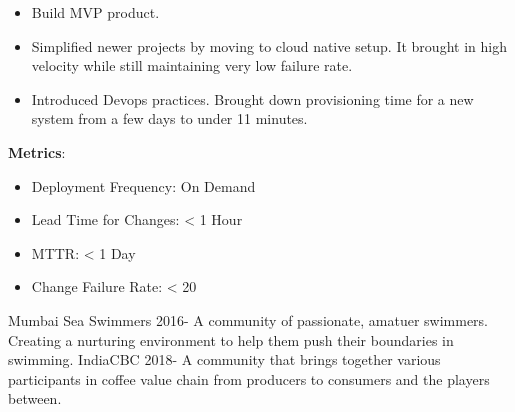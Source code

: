 \documentclass[11pt]{spidercv}
\begin{document}
\begin{MainPart}
{            \begin{DoubleColumns}
	            \begin{itemize}
	            \item[\ding{51}]Build MVP product.\\ 
            	\item[\ding{51}]Simplified newer projects by moving to cloud native setup. It brought in high velocity while still maintaining very low failure rate.\\
            	\item[\ding{51}]Introduced Devops practices. Brought down provisioning time for a new system from a few days to under 11 minutes.
            	\end{itemize}
            \nextcolumn
            	\textbf{Metrics}: \\
            		\begin{itemize}
	            		\item Deployment Frequency: On Demand \\
            			\item Lead Time for Changes: < 1 Hour \\
            		    \item MTTR: < 1 Day \\
            			\item Change Failure Rate: < 20%
	            	\end{itemize}
    		\end{DoubleColumns}
        }

    
    \Experience
        {\ColorHighlight}
		{Mumbai Sea Swimmers}
		{}
		{2016-\faUndo}
        {   
            A community of passionate, amatuer swimmers. Creating a nurturing environment to help them push their boundaries in swimming. 
        }
	\Experience
        {\ColorHighlight}
		{IndiaCBC}
		{}
		{2018-\faUndo}
        {   
            A community that brings together various participants in coffee value chain from producers to consumers and the players between.
        }
        
    \end{MainPart}

    
\end{document}
